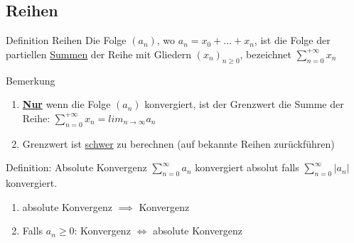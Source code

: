 \documentclass[a4paper,10pt]{article}
\begin{document}
\subsection{Reihen}
\begin{defbox}
    {Definition Reihen}
    Die Folge $(a_n)$, wo $a_n=x_0+...+x_n$, ist die Folge der partiellen \underline{Summen} der Reihe mit Gliedern $(x_n)_{n\ge0}$, bezeichnet $\sum_{n=0}^{+\infty}x_n$
\end{defbox}
\begin{bembox}
    {Bemerkung}
    \begin{enumerate}
        \item \textbf{\underline{Nur}} wenn die Folge $(a_n)$ konvergiert, ist der Grenzwert die Summe der Reihe: $\sum_{n=0}^{+\infty}x_n=lim_{n\to\infty}a_n$
        \item Grenzwert ist \underline{schwer} zu berechnen (auf bekannte Reihen zurückführen)
    \end{enumerate}
\end{bembox}
\begin{defbox}
    {Definition: Absolute Konvergenz}
    $\sum_{n=0}^{\infty}a_n$ konvergiert absolut falls $\sum_{n=0}^\infty|a_n|$ konvergiert.
    \begin{enumerate}
        \item absolute Konvergenz $\implies$ Konvergenz
        \item Falls $a_n\ge 0$: Konvergenz $\iff$ absolute Konvergenz
    \end{enumerate}
\end{defbox}
\end{document}
